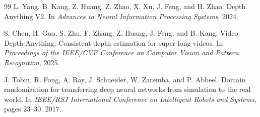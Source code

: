\documentclass[10pt,twocolumn,letterpaper]{article}
\begin{document}
{\begin{thebibliography}{99}
L. Yang, B. Kang, Z. Huang, Z. Zhao, X. Xu, J. Feng, and H. Zhao.
Depth Anything {V2}.
In \emph{Advances in Neural Information Processing Systems}, 2024.

S. Chen, H. Guo, S. Zhu, F. Zhang, Z. Huang, J. Feng, and B. Kang.
Video Depth Anything: Consistent depth estimation for super-long videos.
In \emph{Proceedings of the IEEE/CVF Conference on Computer Vision and Pattern Recognition}, 2025.

J. Tobin, R. Fong, A. Ray, J. Schneider, W. Zaremba, and P. Abbeel.
Domain randomization for transferring deep neural networks from simulation to the real world.
In \emph{IEEE/RSJ International Conference on Intelligent Robots and Systems}, pages 23--30, 2017.

\end{thebibliography}
}
\end{document}
